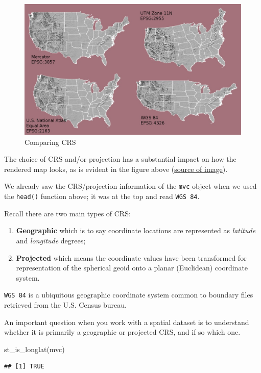 \documentclass[
]{book}
\newenvironment{Shaded}{\begin{snugshade}}{\end{snugshade}}
\newcommand{\FunctionTok}[1]{\textcolor[rgb]{0.00,0.00,0.00}{#1}}
\newcommand{\NormalTok}[1]{#1}
\providecommand{\tightlist}{%
  \setlength{\itemsep}{0pt}\setlength{\parskip}{0pt}}
\begin{document}
\begin{figure}
\includegraphics[width=0.5\linewidth]{images/compare-crs} \caption{Comparing CRS}\label{fig:unnamed-chunk-14}
\end{figure}

The choice of CRS and/or projection has a substantial impact on how the rendered map looks, as is evident in the figure above (\href{https://datacarpentry.org/organization-geospatial/03-crs/}{source of image}).

We already saw the CRS/projection information of the \texttt{mvc} object when we used the \texttt{head()} function above; it was at the top and read \texttt{WGS\ 84}.

Recall there are two main types of CRS:

\begin{enumerate}
\def\labelenumi{\arabic{enumi}.}
\tightlist
\item
  \textbf{Geographic} which is to say coordinate locations are represented as \emph{latitude} and \emph{longitude} degrees;
\item
  \textbf{Projected} which means the coordinate values have been transformed for representation of the spherical geoid onto a planar (Euclidean) coordinate system.
\end{enumerate}

\texttt{WGS\ 84} is a ubiquitous geographic coordinate system common to boundary files retrieved from the U.S. Census bureau.

An important question when you work with a spatial dataset is to understand whether it is primarily a geographic or projected CRS, and if so which one.

\begin{Shaded}
\begin{Highlighting}[]
\FunctionTok{st\_is\_longlat}\NormalTok{(mvc)}
\end{Highlighting}
\end{Shaded}

\begin{verbatim}
## [1] TRUE
\end{verbatim}
\end{document}
